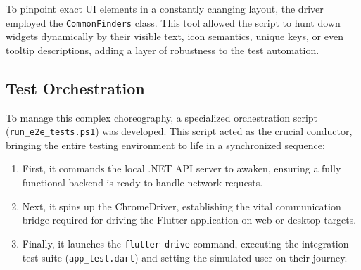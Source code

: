 To pinpoint exact UI elements in a constantly changing layout, the driver employed the \texttt{CommonFinders} class. This tool allowed the script to hunt down widgets dynamically by their visible text, icon semantics, unique keys, or even tooltip descriptions, adding a layer of robustness to the test automation.

\subsection{Test Orchestration}
To manage this complex choreography, a specialized orchestration script (\texttt{run\_e2e\_tests.ps1}) was developed. This script acted as the crucial conductor, bringing the entire testing environment to life in a synchronized sequence:
\begin{enumerate}
    \item First, it commands the local .NET API server to awaken, ensuring a fully functional backend is ready to handle network requests.
    \item Next, it spins up the ChromeDriver, establishing the vital communication bridge required for driving the Flutter application on web or desktop targets.
    \item Finally, it launches the \texttt{flutter drive} command, executing the integration test suite (\texttt{app\_test.dart}) and setting the simulated user on their journey.
\end{enumerate}

